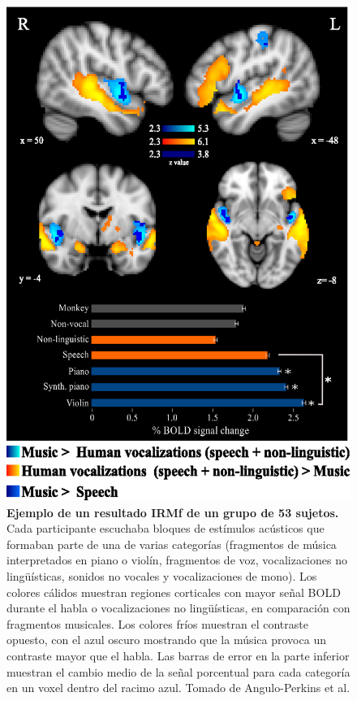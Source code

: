 \documentclass[12pt,a5,twoside]{book}
\begin{document}
\begin{figure}
	\centering
    \includegraphics [scale=1,center] {Arafat_Figure3.eps}
    \caption{\textbf{Ejemplo de un resultado IRMf de un grupo de 53 sujetos.} Cada participante escuchaba bloques de estímulos acústicos que formaban parte de una de varias categorías (fragmentos de música interpretados en piano o violín, fragmentos de voz, vocalizaciones no lingüísticas, sonidos no vocales y vocalizaciones de mono). Los colores cálidos muestran regiones corticales con mayor señal BOLD durante el habla o vocalizaciones no lingüísticas, en comparación con fragmentos musicales. Los colores fríos muestran el contraste opuesto, con el azul oscuro mostrando que la música provoca un contraste mayor que el habla. Las barras de error en la parte inferior muestran el cambio medio de la señal porcentual para cada categoría en un voxel dentro del racimo azul. Tomado de Angulo-Perkins et al. \citep{Angulo_2014}}
    \label{F:Arafat_Figure3}
\end{figure}
\end{document}
